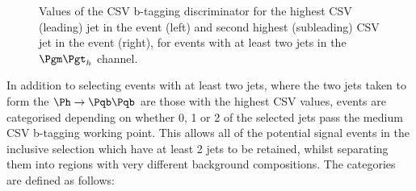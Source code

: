 \begin{figure}
\begin{center}

\end{center}
\caption{
Values of the \ac{CSV} b-tagging discriminator for the highest \ac{CSV}
(leading) jet in the event (left) and second highest (subleading) \ac{CSV} jet
in the event (right), for events with at least two jets in the $\mutau$ channel.}
\label{fig:Hhhcsv}
\end{figure} 

In addition to selecting events with at least two jets, where the two jets taken
to form the $\Ph\to\Pqb\Pqb$ are those with the highest \ac{CSV} values, events
are categorised depending on whether 0, 1 or 2 of the selected jets pass the
medium \ac{CSV} b-tagging working point. This allows all of the potential signal
events in the inclusive selection which have at least 2 jets to be retained,
whilst separating them into regions with very different background compositions.
The categories are defined as follows:

